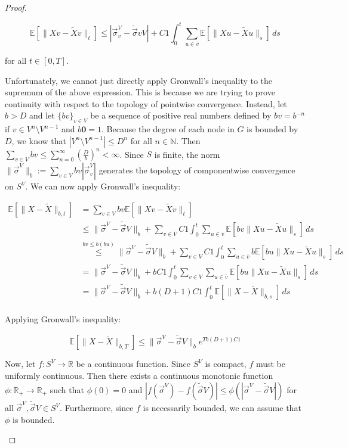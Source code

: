 \documentclass[12pt]{article}
\newcommand{\mb}{\mathbb}
\newcommand{\ra}{\rightarrow}
\newcommand{\ov}{\overline}
\newcommand{\os}{\overset}
\newcommand{\ind}{\hspace{24pt}}
\newcommand{\ex}[1]{\mb{E}\left[#1\right]}			%
\renewcommand{\root}{\mathbf{0}}				%
\renewcommand{\v}{v}							%
\newcommand{\vv}{u}								%
\renewcommand{\S}{S}							%
\newcommand{\s}{\sigma}							%
\newcommand{\sv}{\vec{\s}}						%
\renewcommand{\b}{b}							%
\newcommand{\T}{T}								%
\renewcommand{\t}{t}							%
\renewcommand{\tt}{s}							%
\newcommand{\X}{X}								%
\newcommand{\carp}[1]{^{#1}}					%
\newcommand{\vsi}[1]{^{#1}}						%
\newcommand{\cind}[1]{_{#1}}					%
\newcommand{\cl}{\ov}							%
\newcommand{\const}{C}							%
\newcommand{\degr}{D}							%
\newcommand{\sln}[1]{^{#1}}						%
\newcommand{\alt}[1]{\widetilde{#1}}			%
\begin{document}
\begin{proof}
\begin{enumerate}[(a)]
\[\ex{\|\X{\v}{} - \alt{\X}{\v}{}\|_\t} \leq |\sv\cind{\v}\vsi{V} - \alt{\sv}{\v}{V}| + \const{1}\int_0^\t \sum_{\vv\in \cl{\v}} \ex{\|\X{\vv}{} - \alt{\X}{\vv}{}\|_\tt}\,d\tt\]

for all \(\t \in [0,\T]\).

\ind Unfortunately, we cannot just directly apply Gronwall's inequality to the supremum of the above expression. This is because we are trying to prove continuity with respect to the topology of pointwise convergence. Instead, let \(\b{} > \degr\) and let \(\{\b{\v}\}_{\v \in V}\) be a sequence of positive real numbers defined by \(\b{\v} = \b{}^{-n}\) if \(\v \in V\sln{n}\setminus V\sln{n-1}\) and \(\b{\root} = 1\). Because the degree of each node in \(G\) is bounded by \(\degr\), we know that \(|V\sln{n}\setminus V\sln{n-1}| \leq \degr^{n}\) for all \(n\in \mb{N}\). Then \(\sum_{\v \in V} \b{\v} \leq \sum_{n=0}^\infty \left(\frac{\degr}{\b{}}\right)^{n} < \infty\). Since \(\S\) is finite, the norm \(\|\sv\cind{}\vsi{V}\|_{\b{}} := \sum_{\v \in V} \b{\v}|\sv\cind{\v}\vsi{V}|\) generates the topology of componentwise convergence on \(\S\carp{V}\). We can now apply Gronwall's inequality:

\begin{align*}
\ex{\|\X{}{} - \alt{\X}{}{}\|_{\b{},\t}} &= \sum_{\v \in V} \b{\v}\ex{\|\X{\v}{} - \alt{\X}{\v}{}\|_\t}\\
&\leq \|\sv\cind{}\vsi{V} - \alt{\sv}{}{V}\|_{\b{}} + \sum_{\v \in V}\const{1}\int_0^\t \sum_{\vv \in \cl{\v}} \ex{\b{\v}\|\X{\vv}{} - \alt{\X}{\vv}{}\|_\tt}\,d\tt\\
&\os{\b{\v}\leq \b{}(\b{\vv})}{\leq} \|\sv\cind{}\vsi{V} - \alt{\sv}{}{V}\|_{\b{}} + \sum_{\v \in V}\const{1}\int_0^\t \sum_{\vv \in \cl{\v}} \b{}\ex{\b{\vv}\|\X{\vv}{} - \alt{\X}{\vv}{}\|_\tt}\,d\tt\\
&= \|\sv\cind{}\vsi{V} - \alt{\sv}{}{V}\|_{\b{}} + \b{}\const{1}\int_0^\t \sum_{\v \in V}\sum_{\vv \in \cl{\v}} \ex{\b{\vv}\|\X{\vv}{} - \alt{\X}{\vv}{}\|_\tt}\,d\tt\\
&=\|\sv\cind{}\vsi{V} - \alt{\sv}{}{V}\|_{\b{}} + \b{}(\degr+1)\const{1}\int_0^\t \ex{\|\X{}{} - \alt{\X}{}{}\|_{\b{},\tt}}\,d\tt\\
\end{align*}

Applying Gronwall's inequality:

\[\ex{\|\X{}{} - \alt{\X}{}{}\|_{\b{},\T}} \leq \|\sv\cind{}\vsi{V} - \alt{\sv}{}{V}\|_{\b{}}e^{\T\b{}(\degr+1)\const{1}}\]

Now, let \(f: \S\carp{V} \ra \mb{R}\) be a continuous function. Since \(\S\carp{V}\) is compact, \(f\) must be uniformly continuous. Then there exists a continuous monotonic function \(\phi: \mb{R}_+ \ra \mb{R}_+\) such that \(\phi(0) = 0\) and \(|f(\sv\cind{}\vsi{V}) - f(\alt{\sv}{}{V})| \leq \phi(|\sv\cind{}\vsi{V} - \alt{\sv}{}{V}|)\) for all \(\sv\cind{}\vsi{V},\alt{\sv}{}{V}\in \S\carp{V}\). Furthermore, since \(f\) is necessarily bounded, we can assume that \(\phi\) is bounded.


\end{enumerate}
\end{proof}
\end{document}
